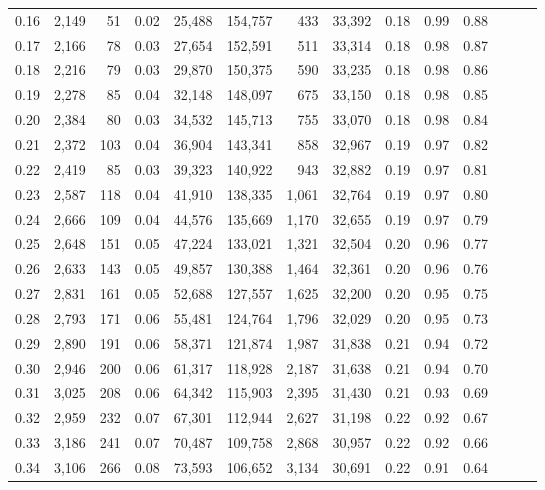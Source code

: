 \begin{tabular}{rrrrrrrrrrrrrr}
0.16 &  2,149 &   51 &  0.02 &   25,488 &  154,757 &     433 &  33,392 &  0.18 &  0.99 &      0.88 \\
0.17 &  2,166 &   78 &  0.03 &   27,654 &  152,591 &     511 &  33,314 &  0.18 &  0.98 &      0.87 \\
0.18 &  2,216 &   79 &  0.03 &   29,870 &  150,375 &     590 &  33,235 &  0.18 &  0.98 &      0.86 \\
0.19 &  2,278 &   85 &  0.04 &   32,148 &  148,097 &     675 &  33,150 &  0.18 &  0.98 &      0.85 \\
0.20 &  2,384 &   80 &  0.03 &   34,532 &  145,713 &     755 &  33,070 &  0.18 &  0.98 &      0.84 \\
0.21 &  2,372 &  103 &  0.04 &   36,904 &  143,341 &     858 &  32,967 &  0.19 &  0.97 &      0.82 \\
0.22 &  2,419 &   85 &  0.03 &   39,323 &  140,922 &     943 &  32,882 &  0.19 &  0.97 &      0.81 \\
0.23 &  2,587 &  118 &  0.04 &   41,910 &  138,335 &   1,061 &  32,764 &  0.19 &  0.97 &      0.80 \\
0.24 &  2,666 &  109 &  0.04 &   44,576 &  135,669 &   1,170 &  32,655 &  0.19 &  0.97 &      0.79 \\
0.25 &  2,648 &  151 &  0.05 &   47,224 &  133,021 &   1,321 &  32,504 &  0.20 &  0.96 &      0.77 \\
0.26 &  2,633 &  143 &  0.05 &   49,857 &  130,388 &   1,464 &  32,361 &  0.20 &  0.96 &      0.76 \\
0.27 &  2,831 &  161 &  0.05 &   52,688 &  127,557 &   1,625 &  32,200 &  0.20 &  0.95 &      0.75 \\
0.28 &  2,793 &  171 &  0.06 &   55,481 &  124,764 &   1,796 &  32,029 &  0.20 &  0.95 &      0.73 \\
0.29 &  2,890 &  191 &  0.06 &   58,371 &  121,874 &   1,987 &  31,838 &  0.21 &  0.94 &      0.72 \\
0.30 &  2,946 &  200 &  0.06 &   61,317 &  118,928 &   2,187 &  31,638 &  0.21 &  0.94 &      0.70 \\
0.31 &  3,025 &  208 &  0.06 &   64,342 &  115,903 &   2,395 &  31,430 &  0.21 &  0.93 &      0.69 \\
0.32 &  2,959 &  232 &  0.07 &   67,301 &  112,944 &   2,627 &  31,198 &  0.22 &  0.92 &      0.67 \\
0.33 &  3,186 &  241 &  0.07 &   70,487 &  109,758 &   2,868 &  30,957 &  0.22 &  0.92 &      0.66 \\
0.34 &  3,106 &  266 &  0.08 &   73,593 &  106,652 &   3,134 &  30,691 &  0.22 &  0.91 &      0.64 \\

\end{tabular}
